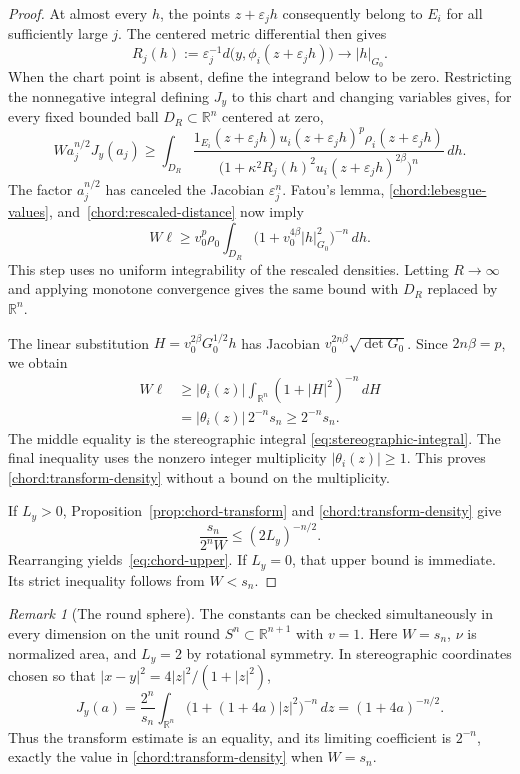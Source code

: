\documentclass[11pt]{article}
\numberwithin{equation}{section}
\theoremstyle{definition}
\theoremstyle{remark}
\newtheorem{remark}[theorem]{Remark}
\begin{document}
\begin{proof}
At almost every $h$, the points $z+\varepsilon_jh$ consequently
belong to $E_i$ for all sufficiently large $j$. The centered
metric differential then gives
\begin{equation}\label{chord:rescaled-distance}
 R_j(h):=\varepsilon_j^{-1}
          d\bigl(y,\phi_i(z+\varepsilon_jh)\bigr)
                    \longrightarrow\lvert h\rvert_{G_0}.
\end{equation}
When the chart point is absent, define the integrand below to
be zero. Restricting the nonnegative integral defining $J_y$
to this chart and changing variables gives, for every fixed
bounded ball $D_R\subset\mathbb R^n$ centered at zero,
\[
 W a_j^{n/2}J_y(a_j)
 \ge\int_{D_R}
 \frac{1_{E_i}(z+\varepsilon_jh)
        u_i(z+\varepsilon_jh)^p\rho_i(z+\varepsilon_jh)}
      {\bigl(1+\kappa^2R_j(h)^2
                   u_i(z+\varepsilon_jh)^{2\beta}\bigr)^n}\,d h.
\]
The factor $a_j^{n/2}$ has canceled the Jacobian
$\varepsilon_j^n$. Fatou's lemma,
\eqref{chord:lebesgue-values}, and~\eqref{chord:rescaled-distance}
now imply
\[
 W\ell\ge v_0^p\rho_0
        \int_{D_R}\bigl(1+v_0^{4\beta}\lvert h\rvert_{G_0}^2\bigr)^{-n}
                 \,d h.
\]
This step uses no uniform integrability of the rescaled densities.
Letting $R\to\infty$ and applying monotone convergence gives the
same bound with $D_R$ replaced by $\mathbb R^n$.

The linear substitution $H=v_0^{2\beta}G_0^{1/2}h$ has Jacobian
$v_0^{2n\beta}\sqrt{\det G_0}$. Since $2n\beta=p$, we obtain
\begin{align*}
 W\ell
 &\ge \lvert \theta_i(z)\rvert
                \int_{\mathbb R^n}(1+\lvert H\rvert^2)^{-n}\,d H\\
 &=\lvert \theta_i(z)\rvert\,2^{-n}s_n
 \ge2^{-n}s_n.
\end{align*}
The middle equality is the stereographic integral
\eqref{eq:stereographic-integral}. The final inequality uses the
nonzero integer multiplicity $\lvert \theta_i(z)\rvert\ge1$. This proves
\eqref{chord:transform-density} without a bound on the multiplicity.

If $L_y>0$, Proposition~\ref{prop:chord-transform} and
\eqref{chord:transform-density} give
\[
 \frac{s_n}{2^nW}\le(2L_y)^{-n/2}.
\]
Rearranging yields~\eqref{eq:chord-upper}. If $L_y=0$, that
upper bound is immediate. Its strict inequality follows from
$W<s_n$.
\end{proof}

\begin{remark}[The round sphere]\label{rem:chord-sphere}
The constants can be checked simultaneously in every dimension
on the unit round $S^n\subset\mathbb R^{n+1}$ with $v=1$. Here
$W=s_n$, $\nu$ is normalized area, and $L_y=2$ by
rotational symmetry. In stereographic coordinates chosen so that
$\lvert x-y\rvert^2=4\lvert z\rvert^2/(1+\lvert z\rvert^2)$,
\[
 J_y(a)=\frac{2^n}{s_n}
     \int_{\mathbb R^n}\bigl(1+(1+4a)\lvert z\rvert^2\bigr)^{-n}\,d z
          =(1+4a)^{-n/2}.
\]
Thus the transform estimate is an equality, and its limiting
coefficient is $2^{-n}$, exactly the value in
\eqref{chord:transform-density} when $W=s_n$.
\end{remark}
\end{document}
